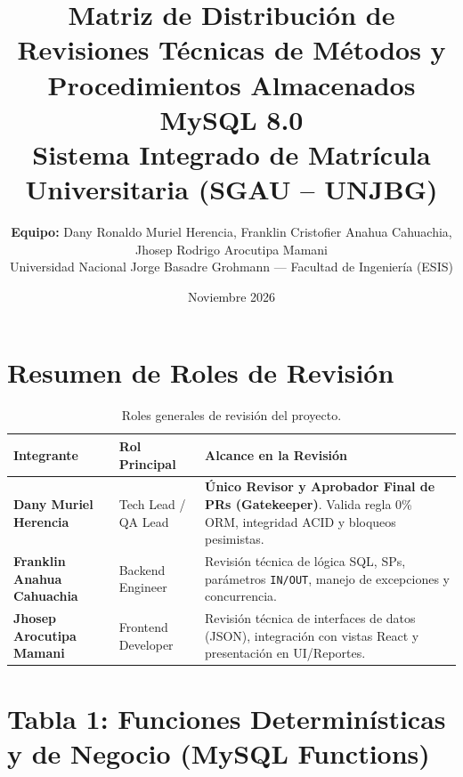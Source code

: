 \documentclass[11pt,a4paper]{article}
\title{\textbf{Matriz de Distribución de Revisiones Técnicas de Métodos y Procedimientos Almacenados MySQL 8.0}\\
\large Sistema Integrado de Matrícula Universitaria (SGAU -- UNJBG)}
\author{\textbf{Equipo:} Dany Ronaldo Muriel Herencia, Franklin Cristofier Anahua Cahuachia, Jhosep Rodrigo Arocutipa Mamani\\
\small Universidad Nacional Jorge Basadre Grohmann --- Facultad de Ingeniería (ESIS)}
\date{Noviembre 2026}
\begin{document}
\maketitle

\section{Resumen de Roles de Revisión}

\begin{table}[htbp]
\centering
\small
\begin{tabularx}{\textwidth}{l p{3.2cm} X}
\toprule
\textbf{Integrante} & \textbf{Rol Principal} & \textbf{Alcance en la Revisión} \\
\midrule
\textbf{Dany Muriel Herencia} & Tech Lead / QA Lead & \textbf{Único Revisor y Aprobador Final de PRs (Gatekeeper)}. Valida regla 0\% ORM, integridad ACID y bloqueos pesimistas. \\
\textbf{Franklin Anahua Cahuachia} & Backend Engineer & Revisión técnica de lógica SQL, SPs, parámetros \texttt{IN/OUT}, manejo de excepciones y concurrencia. \\
\textbf{Jhosep Arocutipa Mamani} & Frontend Developer & Revisión técnica de interfaces de datos (JSON), integración con vistas React y presentación en UI/Reportes. \\
\bottomrule
\end{tabularx}
\caption{Roles generales de revisión del proyecto.}
\label{tab:roles-revision}
\end{table}

\vspace{0.5cm}

\section{Tabla 1: Funciones Determinísticas y de Negocio (MySQL Functions)}
\end{document}
